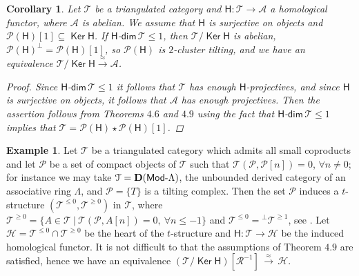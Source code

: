 \documentclass[oneside, a4paper,reqno]{amsart}
\numberwithin{equation}{section}
\newtheorem{cor}[thm]{Corollary}
\theoremstyle{definition}
\newtheorem{exam}[thm]{Example}
\begin{document}
\begin{cor} Let ${\mathcal T}$ be a triangulated category and $\mathsf{H} \colon {\mathcal T} {\longrightarrow} {\mathscr A}$ a homological functor, where ${\mathscr A}$ is abelian. We assume that $\mathsf{H}$ is surjective on objects and $\mathcal P(\mathsf{H})[1] \subseteq \operatorname*{\mathsf{Ker}}\mathsf{H}$. If $\mathsf{H}$-$\mathsf{dim}\, {\mathcal T} \leq 1$, then ${\mathcal T}/\operatorname*{\mathsf{Ker}}\mathsf{H}$ is abelian, $\mathcal P(\mathsf{H})^{\bot} = \mathcal P(\mathsf{H})[1]$, so $\mathcal P(\mathsf{H})$ is $2$-cluster tilting, and we have an equivalence ${\mathcal T}/\operatorname*{\mathsf{Ker}}\mathsf{H} \stackrel{\approx}{\longrightarrow} {\mathscr A}$. 
\begin{proof} Since $\mathsf{H}$-$\mathsf{dim}\, {\mathcal T} \leq 1$ it follows that ${\mathcal T}$ has enough $\mathsf{H}$-projectives, and since $\mathsf{H}$ is surjective on objects, it follows that ${\mathscr A}$ has  enough projectives. Then the assertion follows from Theorems $4.6$ and $4.9$ using the fact that $\mathsf{H}$-$\mathsf{dim}\,{\mathcal T} \leq 1$ implies that ${\mathcal T} = \mathcal P(\mathsf{H}) \star \mathcal P(\mathsf{H})[1]$.
\end{proof} 
 \end{cor}

 
 \begin{exam} Let ${\mathcal T}$ be a triangulated category which admits all small coproducts and let $\mathcal P$ be a set of compact objects of ${\mathcal T}$ such that ${\mathcal T}(\mathcal P,\mathcal P[n]) = 0$, $\forall n \neq 0$; for instance we may take ${\mathcal T} = {\bf D}(\operatorname*{\mathsf{Mod}-\!}\Lambda)$, the unbounded derived category of an associative ring $\Lambda$, and $\mathcal P = \{T\}$ is a tilting complex.  Then the set $\mathcal P$ induces a $t$-structure $({\mathcal T}^{\leq 0}, {\mathcal T}^{\geq 0})$ in ${\mathcal T}$, where ${\mathcal T}^{\geq 0} = \{A \in {\mathcal T} \ | \ {\mathcal T}(\mathcal P,A[n]) = 0, \ \forall n \leq -1\}$ and  ${\mathcal T}^{\leq 0} = {^{\bot}}{\mathcal T}^{\geq 1}$, see \cite{BR}.  Let $\mathcal H = {\mathcal T}^{\leq 0} \cap {\mathcal T}^{\geq 0}$ be the heart of the $t$-structure and $\mathsf{H} \colon {\mathcal T} {\longrightarrow} \mathcal H$ be the induced homological functor. It is not difficult to  that the assumptions of Theorem $4.9$ are satisfied, hence we have an equivalence $({\mathcal T}/\operatorname*{\mathsf{Ker}}\mathsf{H})[{\mathcal R}^{-1}] \, \stackrel{\approx}{\longrightarrow} \, \mathcal H$. 
 \end{exam} 
  
\end{document}
